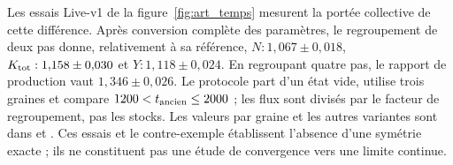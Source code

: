 Les essais Live-v1 de la figure~\ref{fig:art_temps} mesurent la portée
collective de cette différence. Après conversion complète des paramètres,
le regroupement de deux pas donne, relativement à sa référence,
$N:1{,}067\pm0{,}018$, $K_{\rm tot}:1{,}158\pm0{,}030$ et
$Y:1{,}118\pm0{,}024$. En regroupant quatre pas, le rapport de
production vaut $1{,}346\pm0{,}026$. Le protocole part d'un état vide,
utilise trois graines et compare $1200<t_{\rm ancien}\le2000$ ;
les flux sont divisés par le facteur de regroupement, pas les stocks.
Les valeurs par graine et les autres variantes sont dans
 et
. Ces essais et le contre-exemple
établissent l'absence d'une symétrie exacte ; ils ne constituent pas
une étude de convergence vers une limite continue.
